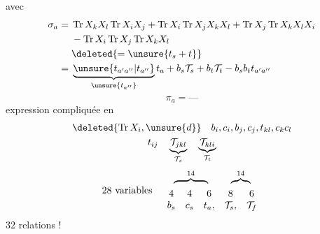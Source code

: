 avec
\[\begin{aligned}
\sigma_a={}&\operatorname{Tr}X_kX_l\operatorname{Tr}X_iX_j
 +\operatorname{Tr}X_i\operatorname{Tr}X_jX_kX_l
 +\operatorname{Tr}X_j\operatorname{Tr}X_kX_lX_i\\
&-\operatorname{Tr}X_i\operatorname{Tr}X_j\operatorname{Tr}X_kX_l\\
&\deleted{=\unsure{t_s+t}}\\
={}&\underbrace{\unsure{t_{a'a''}|t_{a''}}}_{\unsure{t_{a''}}}t_a
 +b_s\mathcal T_s+b_t\mathcal T_t-b_sb_t t_{a'a''}
\end{aligned}\]
\[\pi_a=\text{---}\]
expression  compliquée en
\[\begin{gathered}
\deleted{\operatorname{Tr}X_i,\unsure{d}}\quad b_i,c_i,b_j,c_j,t_{kl},c_kc_l\\
t_{ij}\quad\underbrace{\mathcal T_{jkl}}_{\mathcal T_s}\quad
\underbrace{\mathcal T_{kli}}_{\mathcal T_t}
\end{gathered}\]
\[
28\text{ variables}\quad
\begin{array}{ccccc}
\multicolumn{3}{c}{\overbrace{\phantom{4\quad4\quad6}}^{14}}&
\multicolumn{2}{c}{\overbrace{\phantom{8\quad6}}^{14}}\\[-.6em]
4&4&6&8&6\\
b_s&c_s&t_a,&\mathcal T_s,&\mathcal T_f
\end{array}
\]
$32$ relations !
